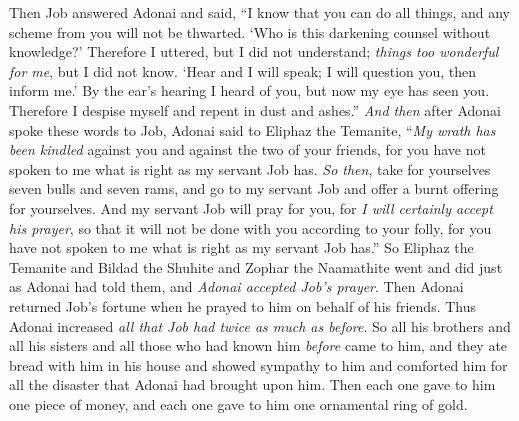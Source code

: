 \begin{biblechapter} %
 Then Job answered Adonai and said,
\verse “I know that you can do all things, 
and any scheme from you will not be thwarted.
\verse ‘Who is this darkening counsel without knowledge?’ 
Therefore I uttered, but I did not understand; 
\textit{things too wonderful for me}, but I did not know.
\verse ‘Hear and I will speak; 
I will question you, then inform me.’
\verse By the ear’s hearing I heard of you, 
but now my eye has seen you.
\verse Therefore I despise myself 
and repent in dust and ashes.”
\verse \textit{And then} after Adonai spoke these words to Job, Adonai said to Eliphaz the Temanite, “\textit{My wrath has been kindled} against you and against the two of your friends, for you have not spoken to me what is right as my servant Job has.
\verse \textit{So then}, take for yourselves seven bulls and seven rams, and go to my servant Job and offer a burnt offering for yourselves. And my servant Job will pray for you, for \textit{I will certainly accept his prayer}, so that it will not be done with you according to your folly, for you have not spoken to me what is right as my servant Job has.”
\verse So Eliphaz the Temanite and Bildad the Shuhite and Zophar the Naamathite went and did just as Adonai had told them, and \textit{Adonai accepted Job’s prayer}.
\verse Then Adonai returned Job’s fortune when he prayed to him on behalf of his friends. Thus Adonai increased \textit{all that Job had twice as much as before}.
\verse So all his brothers and all his sisters and all those who had known him \textit{before} came to him, and they ate bread with him in his house and showed sympathy to him and comforted him for all the disaster that Adonai had brought upon him. Then each one gave to him one piece of money, and each one gave to him one ornamental ring of gold.

\end{biblechapter}
